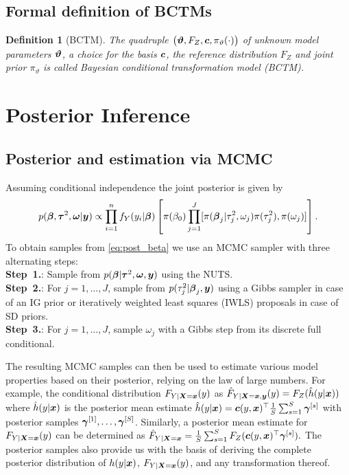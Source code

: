 \documentclass[12pt]{article}
\theoremstyle{plain}
\newtheorem{definition}[theorem]{Definition}
\begin{document}
\subsection{Formal definition of BCTMs}\label{sec:formaldef}

\begin{definition}[BCTM]
The quadruple $\big(\text{\boldmath$\vartheta$},F_Z,\text{\boldmath$c$}, \pi_\vartheta(\cdot)\big)$ of unknown model parameters $\text{\boldmath$\vartheta$}$, a choice for the basis $\text{\boldmath$c$}$, the reference distribution $F_Z$ and joint prior $\pi_\vartheta$ \textit{is called Bayesian conditional transformation model (BCTM)}.
\end{definition}

\section{Posterior Inference}\label{sec:mcmc}
\subsection{Posterior and estimation via MCMC}

Assuming conditional independence the joint posterior is given by
\begin{align}\label{eq:post_beta}
 p(\text{\boldmath$\beta$}, \text{\boldmath$\tau$}^2, \text{\boldmath$\omega$}|\text{\boldmath$y$}) \propto
 \prod_{i=1}^n f_Y(y_i | \text{\boldmath$\beta$})
 \left[\pi(\beta_0)
 \prod_{j=1}^{J} [\pi(\text{\boldmath$\beta$}_j |\tau_{j}^2,\omega_j) \pi(\tau_{j}^2),\pi(\omega_j)]
 \right].
\end{align}
To obtain samples from  \eqref{eq:post_beta} we use an MCMC sampler with three alternating steps:\\
\textbf{Step~1.}: Sample from $p(\text{\boldmath$\beta$}|\text{\boldmath$\tau$}^2, \text{\boldmath$\omega$}, \text{\boldmath$y$})$ using the NUTS.\\
\textbf{Step~2.}: For $j=1,\ldots,J$, sample from $p(\tau_{j}^2|\text{\boldmath$\beta$}_j,\text{\boldmath$y$})$ using a Gibbs sampler in case of an IG prior or  iteratively weighted least squares (IWLS) proposals in case of SD priors.\\
\textbf{Step~3.}: For $j=1,\ldots,J$, sample $\omega_j$ with a Gibbs step from its discrete full conditional.

The resulting MCMC samples can then be used to estimate various model properties based on their posterior, relying on the law of large numbers. For example, the conditional distribution $F_{Y|\text{\boldmath$X$}=\text{\boldmath$x$}}(y)$ as $\hat{F}_{Y|\text{\boldmath$X$}=\text{\boldmath$x$},\text{\boldmath$y$}}(y) = F_Z(\hat{h}(y|\text{\boldmath$x$}))$
where $\hat{h}(y|\text{\boldmath$x$})$ is the posterior mean estimate
$\hat{h}(y|\text{\boldmath$x$})= \text{\boldmath$c$}(y,\text{\boldmath$x$})^\top\frac{1}{S}\sum_{s=1}^S \text{\boldmath$\gamma$}^{[s]}$
with posterior samples $\text{\boldmath$\gamma$}^{[1]},\ldots,\text{\boldmath$\gamma$}^{[S]}$. Similarly, a posterior mean estimate for $F_{Y|\text{\boldmath$X$}=\text{\boldmath$x$}}(y)$ can be determined as
$\hat{F}_{Y|\text{\boldmath$X$}=\text{\boldmath$x$}}=\frac{1}{S}\sum_{s=1}^SF_Z(\text{\boldmath$c$}(y,\text{\boldmath$x$})^\top\text{\boldmath$\gamma$}^{[s]}).$
The posterior samples also provide us with the basis of deriving the complete posterior distribution of $h(y|\text{\boldmath$x$})$, $F_{Y|\text{\boldmath$X$}=\text{\boldmath$x$}}(y)$, and any transformation thereof.
\end{document}

